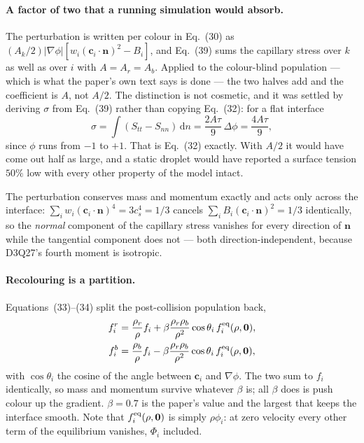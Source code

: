 \documentclass[11pt,a4paper]{article}
\newcommand{\cs}{c_s}
\newcommand{\ci}{\bm{c}_i}
\newcommand{\nn}{\bm{n}}
\begin{document}
\paragraph{A factor of two that a running simulation would absorb.} The
perturbation is written per colour in Eq.~(30) as
$(A_k/2)|\nabla\phi|[w_i(\ci\cdot\nn)^2 - B_i]$, and Eq.~(39) sums the capillary
stress over $k$ as well as over $i$ with $A = A_r = A_b$. Applied to the
colour-blind population --- which is what the paper's own text says is done ---
the two halves add and the coefficient is $A$, not $A/2$. The distinction is not
cosmetic, and it was settled by deriving $\sigma$ from Eq.~(39) rather than
copying Eq.~(32): for a flat interface
\begin{equation}
  \sigma = \int (S_{tt} - S_{nn})\,\mathrm{d}n
         = \frac{2A\tau}{9}\,\Delta\phi
         = \frac{4A\tau}{9},
\end{equation}
since $\phi$ runs from $-1$ to $+1$. That is Eq.~(32) exactly. With $A/2$ it
would have come out half as large, and a static droplet would have reported a
surface tension $50\%$ low with every other property of the model intact.

The perturbation conserves mass and momentum exactly and acts only across the
interface: $\sum_i w_i (\ci\cdot\nn)^4 = 3\cs^4 = 1/3$ cancels
$\sum_i B_i (\ci\cdot\nn)^2 = 1/3$ identically, so the \emph{normal} component
of the capillary stress vanishes for every direction of $\nn$ while the
tangential component does not --- both direction-independent, because D3Q27's
fourth moment is isotropic.

\paragraph{Recolouring is a partition.} Equations~(33)--(34) split the
post-collision population back,
\begin{align}
  f_i^r &= \frac{\rho_r}{\rho} f_i
           + \beta \frac{\rho_r \rho_b}{\rho^2}\cos\theta_i\, f_i^{\rm eq}(\rho, \bm{0}), \\
  f_i^b &= \frac{\rho_b}{\rho} f_i
           - \beta \frac{\rho_r \rho_b}{\rho^2}\cos\theta_i\, f_i^{\rm eq}(\rho, \bm{0}),
\end{align}
with $\cos\theta_i$ the cosine of the angle between $\ci$ and $\nabla\phi$. The
two sum to $f_i$ identically, so mass and momentum survive whatever $\beta$ is;
all $\beta$ does is push colour up the gradient. $\beta = 0.7$ is the paper's
value and the largest that keeps the interface smooth. Note that
$f_i^{\rm eq}(\rho, \bm{0})$ is simply $\rho\phi_i$: at zero velocity every
other term of the equilibrium vanishes, $\Phi_i$ included.
\end{document}
